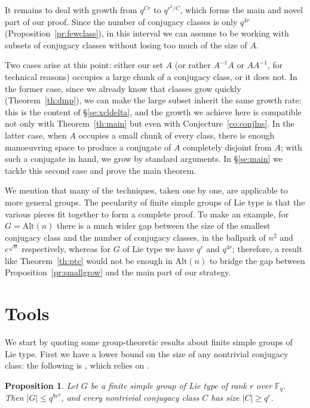 \documentclass[a4paper]{article}
\newtheorem{proposition}{Proposition}[section]
\theoremstyle{definition}
\numberwithin{equation}{section}
\begin{document}
It remains to deal with growth from $q^{Cr}$ to $q^{r^{2}/C}$, which forms the main and novel part of our proof. Since the number of conjugacy classes is only $q^{4r}$ (Proposition~\ref{pr:fewclass}), in this interval we can assume to be working with subsets of conjugacy classes without losing too much of the size of $A$.

Two cases arise at this point: either our set $A$ (or rather $A^{-1}A$ or $AA^{-1}$, for technical reasons) occupies a large chunk of a conjugacy class, or it does not. In the former case, since we already know that classes grow quickly (Theorem~\ref{th:dmp}), we can make the large subset inherit the same growth rate: this is the content of \S\ref{se:xcldelta}, and the growth we achieve here is compatible not only with Theorem~\ref{th:main} but even with Conjecture~\ref{co:conjlns}. In the latter case, when $A$ occupies a small chunk of every class, there is enough manoeuvring space to produce a conjugate of $A$ completely disjoint from $A$; with such a conjugate in hand, we grow by standard arguments. In \S\ref{se:main} we tackle this second case and prove the main theorem.

We mention that many of the techniques, taken one by one, are applicable to more general groups. The pecularity of finite simple groups of Lie type is that the various pieces fit together to form a complete proof. To make an example, for $G=\mathrm{Alt}(n)$ there is a much wider gap between the size of the smallest conjugacy class and the number of conjugacy classes, in the ballpark of $n^{2}$ and $e^{\sqrt{n}}$ respectively, whereas for $G$ of Lie type we have $q^{r}$ and $q^{4r}$; therefore, a result like Theorem~\ref{th:ptc} would not be enough in $\mathrm{Alt}(n)$ to bridge the gap between Proposition~\ref{pr:smallgrow} and the main part of our strategy.

\section{Tools}

We start by quoting some group-theoretic results about finite simple groups of Lie type. First we have a lower bound on the size of any nontrivial conjugacy class: the following is \cite[Prop.~2.3]{GPSS13}, which relies on \cite[\S 5]{KL90}.

\begin{proposition}\label{pr:qnclass}
Let $G$ be a finite simple group of Lie type of rank $r$ over $\mathbb{F}_{q}$. Then $|G|\leq q^{8r^{2}}$, and every nontrivial conjugacy class $C$ has size $|C|\geq q^{r}$.
\end{proposition}
\end{document}

